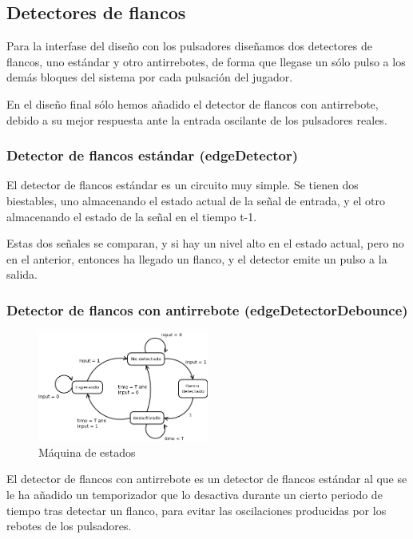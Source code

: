 \subsection{Detectores de flancos}
\label{edgeDetectors}

Para la interfase del diseño con los pulsadores diseñamos dos detectores de flancos, uno estándar y otro antirrebotes, de forma que llegase un sólo pulso a los demás bloques del sistema por cada pulsación del jugador.

En el diseño final sólo hemos añadido el detector de flancos con antirrebote, debido a su mejor respuesta ante la entrada oscilante de los pulsadores reales.

\subsubsection{Detector de flancos estándar (edgeDetector)}
\label{edgeDetectorStd}
El detector de flancos estándar es un circuito muy simple. Se tienen dos biestables, uno almacenando el estado actual de la señal de entrada, y el otro almacenando el estado de la señal en el tiempo t-1.

Estas dos señales se comparan, y si hay un nivel alto en el estado actual, pero no en el anterior, entonces ha llegado un flanco, y el detector emite un pulso a la salida.


\subsubsection{Detector de flancos con antirrebote (edgeDetectorDebounce)}
\label{edgeDetectorDebounce}

\begin{figure}[H]
	\centering
	\includegraphics[width=0.5\textwidth]{edgeDetectorDebounceFSM.png}
	\caption{Máquina de estados}\label{fig:edgeDetectorDebounceFSM}
\end{figure}

El detector de flancos con antirrebote es un detector de flancos estándar al que se le ha añadido un temporizador que lo desactiva durante un cierto periodo de tiempo tras detectar un flanco, para evitar las oscilaciones producidas por los rebotes de los pulsadores.

